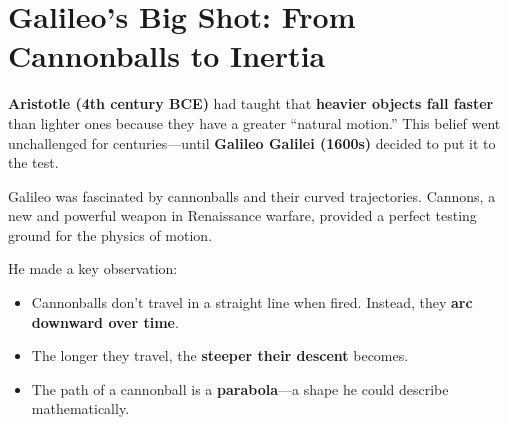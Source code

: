 
\section*{Galileo’s Big Shot: From Cannonballs to Inertia}

\textbf{Aristotle (4th century BCE)} had taught that \textbf{heavier objects fall faster} than lighter ones because they have a greater “natural motion.” This belief went unchallenged for centuries—until \textbf{Galileo Galilei (1600s)} decided to put it to the test.

Galileo was fascinated by cannonballs and their curved trajectories. Cannons, a new and powerful weapon in Renaissance warfare, provided a perfect testing ground for the physics of motion.

He made a key observation:

\begin{itemize}
    \item Cannonballs don’t travel in a straight line when fired. Instead, they \textbf{arc downward over time}.
    \item The longer they travel, the \textbf{steeper their descent} becomes.
    \item The path of a cannonball is a \textbf{parabola}—a shape he could describe mathematically.
\end{itemize}

\begin{center}
\end{center}



